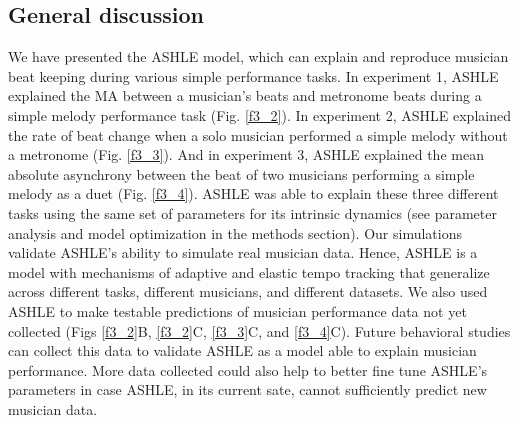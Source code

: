 \documentclass{report}
\begin{document}
\subsection{General discussion}
We have presented the ASHLE model, which can explain and reproduce musician beat keeping during various simple performance tasks. In experiment 1, ASHLE explained the MA between a musician's beats and metronome beats during a simple melody performance task (Fig.{} \ref{f3_2}). In experiment 2, ASHLE explained the rate of beat change when a solo musician performed a simple melody without a metronome (Fig.{} \ref{f3_3}). And in experiment 3, ASHLE explained the mean absolute asynchrony between the beat of two musicians performing a simple melody as a duet (Fig.{} \ref{f3_4}). ASHLE was able to explain these three different tasks using the same set of parameters for its intrinsic dynamics (see parameter analysis and model optimization in the methods section). Our simulations validate ASHLE's ability to simulate real musician data. Hence, ASHLE is a model with mechanisms of adaptive and elastic tempo tracking that generalize across different tasks, different musicians, and different datasets. We also used ASHLE to make testable predictions of musician performance data not yet collected (Figs \ref{f3_2}B, \ref{f3_2}C, \ref{f3_3}C, and \ref{f3_4}C). Future behavioral studies can collect this data to validate ASHLE as a model able to explain musician performance. More data collected could also help to better fine tune ASHLE's parameters in case ASHLE, in its current sate, cannot sufficiently predict new musician data.
\end{document}
